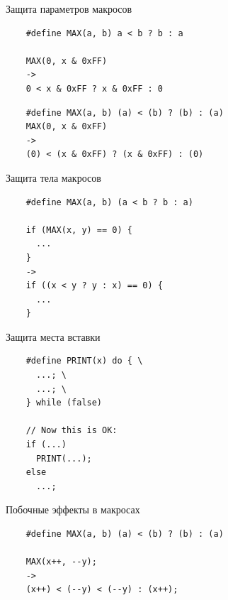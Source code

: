 \documentclass[unknownkeysallowed,xcolor=table]{beamer}
\begin{document}
\begin{frame}[fragile]{Защита параметров макросов}
  \begin{lstlisting}
    #define MAX(a, b) a < b ? b : a

    MAX(0, x & 0xFF)
    ->
    0 < x & 0xFF ? x & 0xFF : 0
  \end{lstlisting}

  \vspace{1em}

  \begin{lstlisting}
    #define MAX(a, b) (a) < (b) ? (b) : (a)
    MAX(0, x & 0xFF)
    ->
    (0) < (x & 0xFF) ? (x & 0xFF) : (0)
  \end{lstlisting}
\end{frame}

\begin{frame}[fragile]{Защита тела макросов}
  \begin{lstlisting}
    #define MAX(a, b) (a < b ? b : a)

    if (MAX(x, y) == 0) {
      ...
    }
    ->
    if ((x < y ? y : x) == 0) {
      ...
    }
  \end{lstlisting}
\end{frame}

\begin{frame}[fragile]{Защита места вставки}
  \begin{lstlisting}
    #define PRINT(x) do { \
      ...; \
      ...; \
    } while (false)

    // Now this is OK:
    if (...)
      PRINT(...);
    else
      ...;
  \end{lstlisting}
\end{frame}

\begin{frame}[fragile]{Побочные эффекты в макросах}
  \begin{lstlisting}
    #define MAX(a, b) (a) < (b) ? (b) : (a)

    MAX(x++, --y);
    ->
    (x++) < (--y) < (--y) : (x++);
  \end{lstlisting}
\end{frame}
\end{document}
